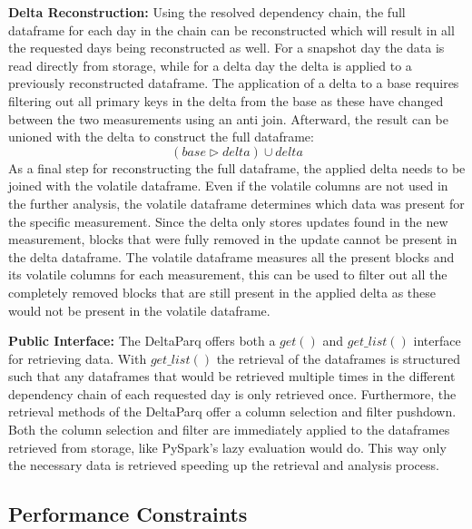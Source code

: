 \textbf{Delta Reconstruction:} Using the resolved dependency chain, the full dataframe for each day in the chain can be reconstructed 
which will result in all the requested days being reconstructed as well. For a snapshot day the data is read 
directly from storage, while for a delta day the delta is applied to a previously reconstructed dataframe. 
The application of a delta to a base requires filtering out all primary keys in the delta from the base as 
these have changed between the two measurements using an anti join. Afterward, the result can be unioned with the delta to 
construct the full dataframe:
$$(base \triangleright delta) \cup delta$$
As a final step for reconstructing the full dataframe, the applied delta needs to be joined with the volatile dataframe. 
Even if the volatile columns are not used in the further analysis, the volatile dataframe determines which data was present 
for the specific measurement. Since the delta only stores updates found in the new measurement, blocks that were fully removed 
in the update cannot be present in the delta dataframe. The volatile dataframe measures all the present blocks and 
its volatile columns for each measurement, this can be used to filter out all the completely removed blocks that are still 
present in the applied delta as these would not be present in the volatile dataframe.

\textbf{Public Interface:} The DeltaParq offers both a $get()$ and $get\_list()$ interface for retrieving data. With $get\_list()$ the retrieval 
of the dataframes is structured such that any dataframes that would be retrieved multiple times in the different dependency 
chain of each requested day is only retrieved once. Furthermore, the retrieval methods of the DeltaParq offer a column selection 
and filter pushdown. Both the column selection and filter are immediately applied to the dataframes retrieved from storage, like 
PySpark's lazy evaluation would do. This way only the necessary data is retrieved speeding up the retrieval and analysis process.

\subsection{Performance Constraints}
\label{sec:performance_constraints}

